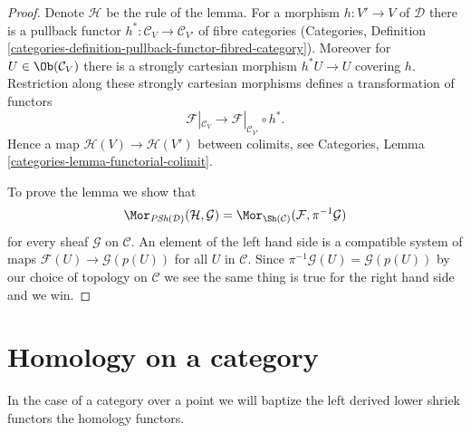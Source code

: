 \begin{proof}
Denote $\mathcal{H}$ be the rule of the lemma.
For a morphism $h : V' \to V$ of $\mathcal{D}$ there is a
pullback functor $h^* : \mathcal{C}_V \to \mathcal{C}_{V'}$ of fibre
categories (Categories, Definition
\ref{categories-definition-pullback-functor-fibred-category}).
Moreover for $U \in \Ob(\mathcal{C}_V)$ there is a
strongly cartesian morphism $h^*U \to U$ covering $h$.
Restriction along these strongly cartesian morphisms defines a
transformation of functors
$$
\mathcal{F}|_{\mathcal{C}_V}
\longrightarrow
\mathcal{F}|_{\mathcal{C}_{V'}} \circ h^*.
$$
Hence a map $\mathcal{H}(V) \to \mathcal{H}(V')$ between colimits, see
Categories, Lemma \ref{categories-lemma-functorial-colimit}.

\medskip\noindent
To prove the lemma we show that
$$
\Mor_{\textit{PSh}(\mathcal{D})}(\mathcal{H}, \mathcal{G}) =
\Mor_{\Sh(\mathcal{C})}(\mathcal{F}, \pi^{-1}\mathcal{G})
$$
for every sheaf $\mathcal{G}$ on $\mathcal{C}$. An element of the
left hand side is a compatible system of maps
$\mathcal{F}(U) \to \mathcal{G}(p(U))$ for all $U$ in $\mathcal{C}$.
Since $\pi^{-1}\mathcal{G}(U) = \mathcal{G}(p(U))$ by our choice
of topology on $\mathcal{C}$ we see the same thing is true for the
right hand side and we win.
\end{proof}

\section{Homology on a category}
\label{sites-cohomology-section-homology}
In the case of a category over a point we will baptize the left derived
lower shriek functors the homology functors.

